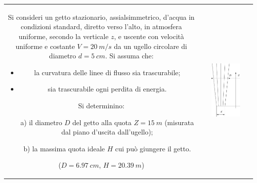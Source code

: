 \noindent
\begin{tabular}{cc}
\begin{minipage}{0.60\textwidth}
\begin{exerciseS}
Si consideri un getto stazionario, assialsimmetrico, d'acqua in 
condizioni standard, diretto verso l'alto, in atmosfera uniforme, 
secondo la verticale $z$, e uscente con velocit\`{a} uniforme e 
costante $V = 20\ m/s$ da un ugello circolare di diametro 
$d = 5\  cm$. Si assuma che:
\begin{itemize}
\item la curvatura delle linee di flusso sia trascurabile;
\item sia trascurabile ogni perdita di energia.
\end{itemize}
Si determinino:
\begin{itemize}
\item[a)] il diametro $D$ del getto alla quota $Z = 15\ m$
          (misurata dal piano d'uscita dall'ugello);
\item[b)] la massima quota ideale $H$ cui pu\`{o} giungere il getto.
\end{itemize}
($D = 6.97\ cm$, $H = 20.39\  m$)
\end{exerciseS}
\end{minipage}
&
\begin{minipage}{0.35\textwidth}
   \begin{center}
   \includegraphics[width=0.60\textwidth]{./fig/getto_vert.eps}
   \end{center}
\end{minipage}
\end{tabular}

